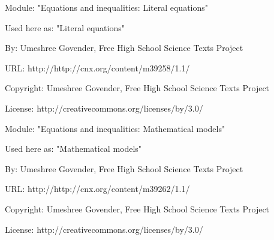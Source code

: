       \par\vspace{9pt}\noindent\begin{minipage}{\textwidth}
      Module: "Equations and inequalities: Literal equations" \par\nopagebreak\noindent
      Used here as: "Literal equations" \par\nopagebreak\noindent
        By: Umeshree Govender, Free High School Science Texts Project\par\nopagebreak\noindent
      URL: http://http://cnx.org/content/m39258/1.1/\par\nopagebreak\noindent
      \par\nopagebreak\noindent
      Copyright: Umeshree Govender, Free High School Science Texts Project\par\nopagebreak\noindent
      License:  http://creativecommons.org/licenses/by/3.0/\par\nopagebreak\noindent
      \par\end{minipage}
      \par\vspace{9pt}\noindent\begin{minipage}{\textwidth}
      Module: "Equations and inequalities: Mathematical models" \par\nopagebreak\noindent
      Used here as: "Mathematical models" \par\nopagebreak\noindent
        By: Umeshree Govender, Free High School Science Texts Project\par\nopagebreak\noindent
      URL: http://http://cnx.org/content/m39262/1.1/\par\nopagebreak\noindent
      \par\nopagebreak\noindent
      Copyright: Umeshree Govender, Free High School Science Texts Project\par\nopagebreak\noindent
      License:  http://creativecommons.org/licenses/by/3.0/\par\nopagebreak\noindent
      \par\end{minipage}
